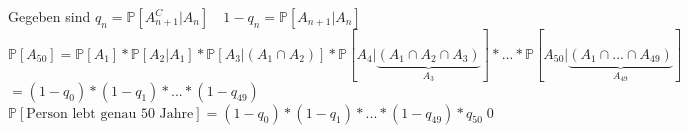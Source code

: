 \begin{enumerate}
	Gegeben sind $q_n = \mathds{P}\left[A_{n+1}^C \vert A_n\right]\quad 1-q_n = \mathds{P}[A_{n+1}\vert A_n]$\smallskip\\
	$\mathds{P}[A_{50}] = \mathds{P}[A_1]*\mathds{P}[A_2 \vert A_1]*\mathds{P}[A_3\vert (A_1 \cap A_2)]*\mathds{P}[A_4 \vert \underbrace{(A_1 \cap A_2 \cap A_3)}_{A_3}] * ... * \mathds{P}[A_{50}\vert \underbrace{(A_1\cap...\cap A_{49})}_{A_{49}}] $\\ $=(1-q_0)*(1-q_1)*...*(1-q_{49})$\medskip\\
	$\mathds{P}[\text{Person lebt genau 50 Jahre}] =(1-q_0)*(1-q_1)*...*(1-q_{49}) * q_{50}$\qed
\end{enumerate}

